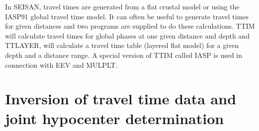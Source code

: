 In SEISAN, travel times are generated from a flat crustal model or using the IASP91 global travel time model. It can often be useful to generate travel times for given distances and two programs are supplied to do these calculations. TTIM will calculate travel times for global phases at one given distance and depth and TTLAYER, will calculate a travel time table (layered flat model) for a given depth and a distance range. A special version of TTIM called IASP is used in connection with EEV and MULPLT.  















\section{Inversion of travel time data and joint hypocenter determination} 











